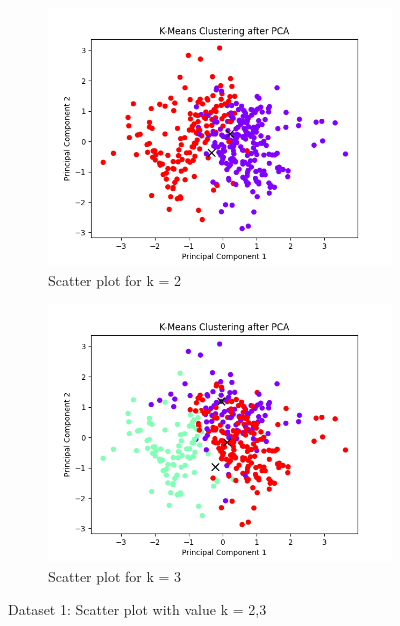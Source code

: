 \documentclass[12pt]{report}
\begin{document}
	\begin{figure}[H]
		\centering
		\begin{subfigure}{.5\textwidth}
			\centering
			\includegraphics[width=.9\linewidth]{../K-means/Output/Dataset1/scatterPlot_k=2.png}
			\caption{Scatter plot for k = 2}
			\label{Dataset1Scatterplotk2}
		\end{subfigure}%
		\begin{subfigure}{.5\textwidth}
			\centering
			\includegraphics[width=.9\linewidth]{../K-means/Output/Dataset1/scatterPlot_k=3.png}
			\caption{Scatter plot for k = 3}
			\label{Dataset1Scatterplotk3}
		\end{subfigure}
		\caption{Dataset 1: Scatter plot with value k = 2,3}
		\label{Dataset1Scatterplot23}
	\end{figure}
\end{document}

